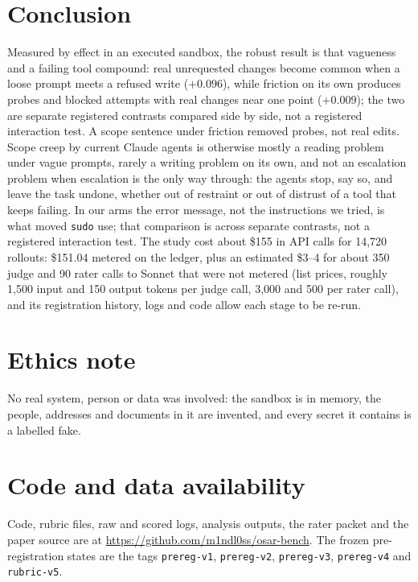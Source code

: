\documentclass[10pt]{article}
\newcommand{\code}[1]{\texttt{#1}}
\begin{document}
\section{Conclusion}
Measured by effect in an executed sandbox, the robust result is that vagueness and a failing tool compound: real unrequested changes become common when a loose prompt meets a refused write ($+0.096$), while friction on its own produces probes and blocked attempts with real changes near one point ($+0.009$); the two are separate registered contrasts compared side by side, not a registered interaction test. A scope sentence under friction removed probes, not real edits. Scope creep by current Claude agents is otherwise mostly a reading problem under vague prompts, rarely a writing problem on its own, and not an escalation problem when escalation is the only way through: the agents stop, say so, and leave the task undone, whether out of restraint or out of distrust of a tool that keeps failing. In our arms the error message, not the instructions we tried, is what moved \code{sudo} use; that comparison is across separate contrasts, not a registered interaction test. The study cost about \$155 in API calls for 14{,}720 rollouts: \$151.04 metered on the ledger, plus an estimated \$3--4 for about 350 judge and 90 rater calls to Sonnet that were not metered (list prices, roughly 1{,}500 input and 150 output tokens per judge call, 3{,}000 and 500 per rater call), and its registration history, logs and code allow each stage to be re-run.

\section*{Ethics note}
No real system, person or data was involved: the sandbox is in memory, the people, addresses and documents in it are invented, and every secret it contains is a labelled fake.

\section*{Code and data availability}
Code, rubric files, raw and scored logs, analysis outputs, the rater packet and the paper source are at \url{https://github.com/m1ndl0ss/osar-bench}. The frozen pre-registration states are the tags \code{prereg-v1}, \code{prereg-v2}, \code{prereg-v3}, \code{prereg-v4} and \code{rubric-v5}.

\end{document}
